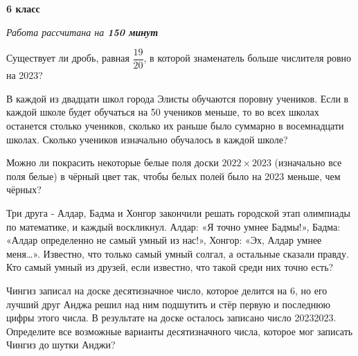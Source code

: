 \hspace{3mm}

\centerline{\bf \huge 6 класс}
\centerline{\normalsize{\it Работа рассчитана на \bf{150} минут}}

\hspace{3mm}

Существует ли дробь, равная $\dfrac{19}{20}$, в которой знаменатель больше числителя ровно на 2023?

\hspace{3mm}

В каждой из двадцати школ города Элисты обучаются поровну учеников. Если в каждой школе будет обучаться на 50 учеников меньше, то во всех школах останется столько учеников, сколько их раньше было суммарно в восемнадцати школах. Сколько учеников изначально обучалось в каждой школе? 

\hspace{3mm}

Можно ли покрасить некоторые белые поля доски $2022\times2023$ (изначально все поля белые) в чёрный цвет так, чтобы белых полей было на 2023 меньше, чем чёрных?

\hspace{3mm}

Три друга - Алдар, Бадма и Хонгор закончили решать городской этап олимпиады по математике, и каждый воскликнул. Алдар: «Я точно умнее Бадмы!», Бадма: «Алдар определенно не самый умный из нас!», Хонгор: «Эх, Алдар умнее меня…». Известно, что только самый умный солгал, а остальные сказали правду. Кто самый умный из друзей, если известно, что такой среди них точно есть?

\hspace{3mm}

Чингиз записал на доске десятизначное число, которое делится на 6, но его лучший друг Анджа решил над ним подшутить и стёр первую и последнюю цифры этого числа. В результате на доске осталось записано число 20232023. Определите все возможные варианты десятизначного числа, которое мог записать Чингиз до шутки Анджи?
